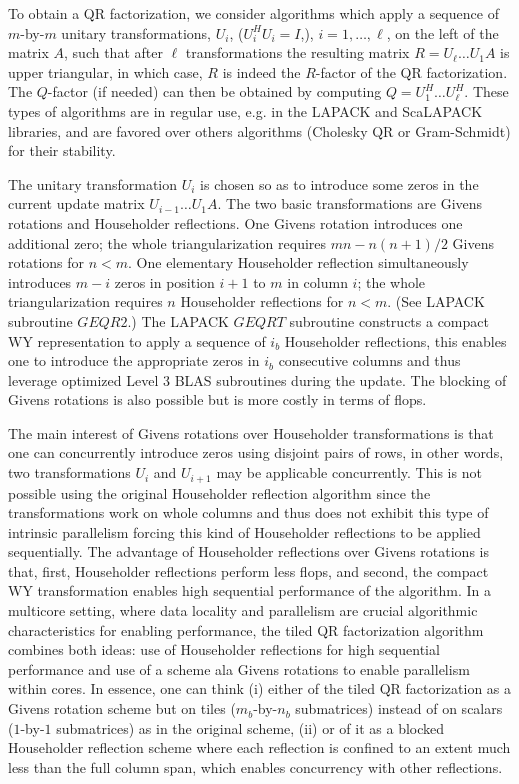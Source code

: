 \documentclass[a4paper,twopages]{article}
\newcommand{\GEQRTWO}{\ensuremath{\mathit{GEQR2}}\xspace}
\newcommand{\GEQRT}{\ensuremath{\mathit{GEQRT}}\xspace}
\begin{document}
To obtain a QR factorization, we consider algorithms which apply a
sequence of $m$-by-$m$ unitary transformations, $U_i$, ($U_i^HU_i=I$,),
$i=1,\dots,\ell$, on the left of the matrix $A$, such that after $\ell$
transformations the resulting matrix $ R = U_\ell \ldots U_1 A $ is upper
triangular, in which case, $R$ is indeed the $R$-factor of the QR factorization.
The $Q$-factor (if needed) can then be obtained by computing $ Q = U_1^H \ldots
U_\ell^H $.  These types of algorithms are in regular use, e.g. in the
LAPACK and ScaLAPACK libraries, and are favored over others algorithms (Cholesky
QR or Gram-Schmidt) for their stability.

The unitary transformation $U_i$ is chosen so as to introduce some zeros in the
current update matrix $ U_{i-1} \ldots U_1 A $. The two basic transformations
are Givens rotations and Householder reflections.  One Givens rotation
introduces one additional zero; the whole triangularization requires $mn -
n(n+1)/2$ Givens rotations for $n<m$. One elementary Householder reflection
simultaneously introduces $m-i$ zeros in position $i+1$ to $m$ in column $i$;
the whole triangularization requires $n$ Householder reflections for $n<m$.
(See LAPACK subroutine \GEQRTWO.) The LAPACK \GEQRT subroutine constructs a
compact WY representation to apply a sequence of $i_b$ Householder reflections,
this enables one to introduce the appropriate zeros in $i_b$ consecutive columns
and thus leverage optimized Level 3 BLAS subroutines during the update. The
blocking of Givens rotations is also possible but is more costly in terms of
flops.

The main interest of Givens rotations over Householder transformations is that
one can concurrently introduce zeros using disjoint pairs of rows, in other
words, two transformations $U_i$ and $U_{i+1}$ may be applicable concurrently.
This is not possible using the original Householder reflection algorithm since
the transformations work on whole columns and thus does not exhibit this type
of intrinsic parallelism forcing this kind of Householder reflections to be
applied sequentially. The advantage of Householder reflections over Givens
rotations is that, first, Householder reflections perform less flops, and second,
the compact WY transformation enables high sequential performance of the
algorithm. In a multicore setting, where data locality and parallelism are
crucial algorithmic characteristics for enabling performance, the tiled QR
factorization algorithm combines both ideas: use of Householder reflections for
high sequential performance and use of a scheme ala Givens rotations to enable
parallelism within cores. In essence, one can think (i) either of the tiled QR
factorization as a Givens rotation scheme but on tiles ($m_b$-by-$n_b$
submatrices) instead of on scalars ($1$-by-$1$ submatrices) as in the original
scheme, (ii) or of it as a blocked Householder reflection scheme
where each reflection is confined to an extent much less than the full column
span, which enables concurrency with other reflections.
\end{document}
